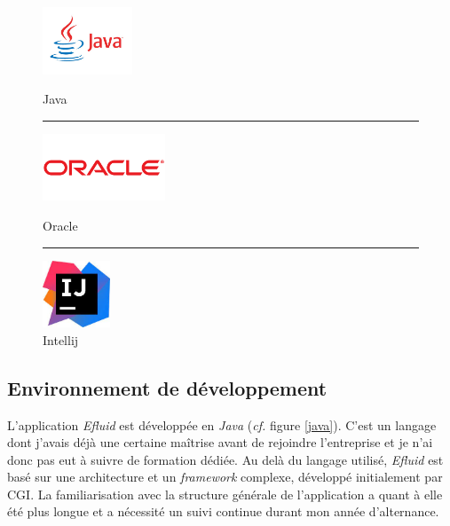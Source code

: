 \documentclass[a4paper, 12pt]{report}
\begin{document}
\begin{figure}[b]
  \begin{center}
    \begin{minipage}{4cm}
      \begin{center}
        \includegraphics[height=2cm]{../res/java.jpg}
        \caption{Java}
        \label{java}
      \end{center}
    \end{minipage}
    \rule{1cm}{0cm}
    \begin{minipage}{4cm}
      \begin{center}
        \includegraphics[height=2cm]{../res/oracle.png}
        \caption{Oracle}
        \label{oracle}
      \end{center}
    \end{minipage}
    \rule{1cm}{0cm}
    \begin{minipage}{4cm}
      \begin{center}
        \includegraphics[height=2cm]{../res/intellij.jpg}
        \vspace{0.1cm}
        \caption{Intellij}
        \label{intellij}
      \end{center}
    \end{minipage}
  \end{center}
\end{figure}

\subsection{Environnement de développement}

L'application \textit{Efluid} est développée en \textit{Java} (\textit{cf.} figure \ref{java}). C'est un langage dont j'avais déjà une certaine maîtrise avant de rejoindre l'entreprise et je n'ai donc pas eut à suivre de formation dédiée. Au delà du langage utilisé, \textit{Efluid} est  basé sur une architecture et un \textit{framework} complexe, développé initialement par CGI. La familiarisation avec la structure générale de l'application a quant à elle été plus longue et a nécessité un suivi continue durant mon année d'alternance. 
\end{document}
